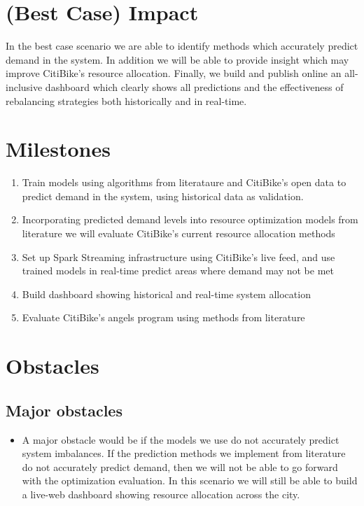 \documentclass{proc}
\begin{document}
\section{(Best Case) Impact}


In the best case scenario we are able to identify methods which accurately predict demand in the system. In addition we will be able to provide insight which may improve CitiBike's resource allocation. Finally, we build and publish online an all-inclusive dashboard which clearly shows all predictions and the effectiveness of rebalancing strategies both historically and in real-time.

\section{Milestones}

\begin{enumerate}
  \item Train models using algorithms from literataure and CitiBike's open data to predict demand in the system, using historical data as validation.
  \item Incorporating predicted demand levels into resource optimization models from literature we will evaluate CitiBike's current resource allocation methods
  \item Set up Spark Streaming infrastructure using CitiBike's live feed, and use trained models in real-time predict areas where demand may not be met
  \item Build dashboard showing historical and real-time system allocation
  \item Evaluate CitiBike's angels program using methods from literature
\end{enumerate}

\section{Obstacles}

\subsection{Major obstacles} 

\begin{itemize}
  \item A major obstacle would be if the models we use do not accurately predict system imbalances. If the prediction methods we implement from literature do not accurately predict demand, then we will not be able to go forward with the optimization evaluation. In this scenario we will still be able to build a live-web dashboard showing resource allocation across the city.
\end{itemize}
\end{document}
